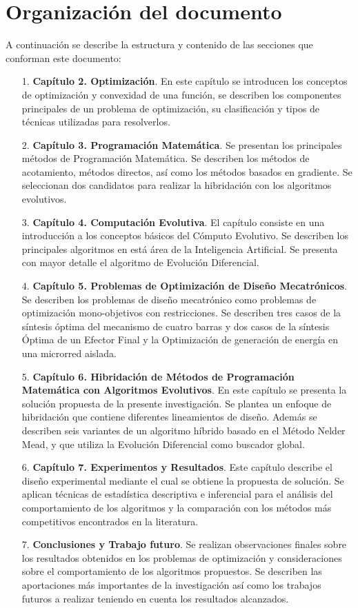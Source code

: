  \section{Organización del documento}
A continuación se describe la estructura y contenido de las secciones que conforman este documento:
  \begin{itemize}
	\item[1.]\textbf{Capítulo 2. Optimización}. En este capítulo se introducen los conceptos de
optimización y convexidad de una función, se describen los componentes principales de un problema de
optimización, su clasificación y tipos de técnicas utilizadas para
resolverlos. 
\item[2.]\textbf{Capítulo 3. Programación Matemática}. Se presentan los principales métodos de Programación Matemática. Se describen los métodos de acotamiento, métodos directos, así como los métodos basados en gradiente. Se seleccionan dos candidatos para realizar la hibridación con los algoritmos evolutivos.
	\item[3.]\textbf{Capítulo 4. Computación Evolutiva}. El capítulo consiste en una introducción a los conceptos básicos del Cómputo Evolutivo. Se describen los principales algoritmos en está área de la Inteligencia Artificial. Se presenta con mayor detalle el algoritmo de Evolución Diferencial.
	\item[4.]\textbf{Capítulo 5. Problemas de Optimización de Diseño Mecatrónicos}. Se describen los problemas de diseño mecatrónico como problemas de optimización mono-objetivos con restricciones. Se describen tres casos de la síntesis óptima del mecanismo de cuatro barras y dos casos de la síntesis Óptima de un Efector Final y la Optimización  de generación de energía en una
microrred aislada. 
	\item[5.]\textbf{Capítulo 6. Hibridación de Métodos de Programación Matemática con Algoritmos Evolutivos}. En este capítulo  se presenta la solución propuesta de la presente investigación. Se plantea un enfoque de hibridación que contiene diferentes lineamientos de diseño. Además se describen seis variantes de un algoritmo híbrido basado en el Método Nelder Mead, y que utiliza la Evolución Diferencial como buscador global. 
	\item[6.]\textbf{Capítulo 7. Experimentos y Resultados}. Este capítulo describe el diseño experimental mediante el cual se obtiene la propuesta de solución. Se aplican técnicas de estadística descriptiva e inferencial para el análisis del comportamiento de los algoritmos y la comparación con los métodos más competitivos encontrados en la literatura.
\item[7.] \textbf{Conclusiones y Trabajo futuro}. Se realizan observaciones finales sobre los resultados obtenidos en los problemas de optimización y consideraciones sobre el comportamiento de los algoritmos propuestos. Se describen las aportaciones más importantes de la investigación así como los trabajos futuros a realizar teniendo en cuenta los resultados alcanzados.

  \end{itemize}
